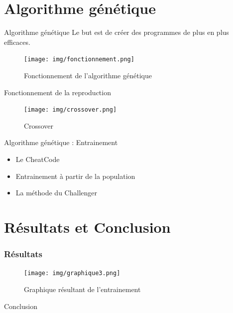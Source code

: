 \documentclass{beamer}
\begin{document}
\section{Algorithme génétique}
\begin{frame}{Algorithme génétique}
    Le but est de créer des programmes de plus en plus efficaces.
    \begin{figure}
        \centering
        \texttt{[image: img/fonctionnement.png]}
        \caption{Fonctionnement de l'algorithme génétique}
    \end{figure}
\end{frame}

\begin{frame}{Fonctionnement de la reproduction}
    \begin{figure}
        \centering
        \texttt{[image: img/crossover.png]}
        \caption{Crossover}
    \end{figure}
\end{frame}

\begin{frame}{Algorithme génétique : Entrainement}
    \begin{itemize}
        \item Le CheatCode
        \item Entrainement à partir de la population
        \item La méthode du Challenger
    \end{itemize}
\end{frame}

\section{Résultats et Conclusion}
\begin{frame}
    \frametitle{Résultats}
    \begin{figure}
        \centering
        \texttt{[image: img/graphique3.png]}
        \caption{Graphique résultant de l'entrainement}
    \end{figure}
\end{frame}

\begin{frame}{}
    \begin{center}
        \Huge Conclusion
    \end{center}
\end{frame}
\end{document}
